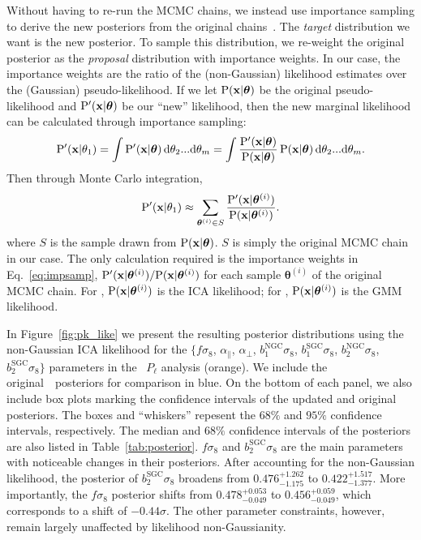 \documentclass[12pt, letterpaper, preprint]{aastex6}
\newcommand{\beq}{\begin{equation}}
\newcommand{\eeq}{\end{equation}}
\newcommand{\Beut}{\citetalias{beutler2017}\xspace}
\newcommand{\Sinh}{\citetalias{sinha2017}\xspace}
\newcommand{\gmm}{{\small{GMM}}\xspace}
\newcommand{\ica}{{\small{ICA}}\xspace}
\begin{document}
Without having to re-run the MCMC chains, we instead use importance sampling
to derive the new posteriors
from the original chains~\citep[see][for details on importance sampling]{wasserman2004}. 
The \emph{target} distribution we want is the new posterior. To sample this 
distribution, we re-weight the original posterior as the \emph{proposal} 
distribution with importance weights. In our case, the importance weights are the ratio 
of the (non-Gaussian) likelihood estimates over the (Gaussian) pseudo-likelihood. If we let 
$\mathrm{P}({\bf x} | \bm{\theta})$ be the original pseudo-likelihood and 
$\mathrm{P}'({\bf x} | \bm{\theta})$ be our ``new'' likelihood, then the new 
marginal likelihood can be calculated through importance sampling:   
\beq
\mathrm{P}'({\bf x} | \theta_1) = \int \mathrm{P}'({\bf x} | \bm{\theta})\,\mathrm{d}\theta_2...\mathrm{d}\theta_m = \int \frac{\mathrm{P}'({\bf x} | \bm{\theta})}{\mathrm{P}({\bf x} | \bm{\theta})}\, \mathrm{P}({\bf x} | \bm{\theta})\,\mathrm{d}\theta_2...\mathrm{d}\theta_m. \\
\eeq
Then through Monte Carlo integration, 
\beq
\mathrm{P}'({\bf x} | \theta_1) \approx \sum\limits_{\bm{\theta}^{(i)} \in S} \frac{\mathrm{P}'({\bf x} | \bm{\theta}^{(i)})}{\mathrm{P}({\bf x} | \bm{\theta}^{(i)})}. \label{eq:impsamp}
\eeq
where $S$ is the sample drawn from $\mathrm{P}({\bf x} | \bm{\theta})$. $S$ 
is simply the original MCMC chain in our case. The only calculation required 
is the importance weights in Eq.~\ref{eq:impsamp}, 
${\mathrm{P}'({\bf x} | \bm{\theta}^{(i)})}/{\mathrm{P}({\bf x} | \bm{\theta}^{(i)})}$ for 
each sample $\bm{\theta}^{(i)}$ of the original MCMC chain. 
For \Beut, $\mathrm{P}({\bf x} | \bm{\theta}^{(i)})$ is the \ica likelihood;  
for \Sinh, $\mathrm{P}({\bf x} | \bm{\theta}^{(i)})$ is the \gmm
likelihood.


In Figure~\ref{fig:pk_like} we present the resulting posterior 
distributions using the non-Gaussian \ica likelihood for the 
$\big \{f \sigma_8$, $\alpha_\parallel$, $\alpha_\perp$, 
$b_1^\mathrm{NGC} \sigma_8$, $b_1^\mathrm{SGC} \sigma_8$, 
$b_2^\mathrm{NGC} \sigma_8$, $b_2^\mathrm{SGC} \sigma_8\big \}$
parameters in the \Beut~$P_\ell$ analysis (orange). We include 
the original~\Beut~posteriors for comparison in blue. On the 
bottom of each panel, we also include box plots marking the 
confidence intervals of the updated and original posteriors. 
The boxes and ``whiskers'' repesent the $68\%$ and $95\%$ 
confidence intervals, respectively. The median and $68\%$ 
confidence intervals of the posteriors are also listed in Table~\ref{tab:posterior}.
$f \sigma_8$ and $b_2^\mathrm{SGC} \sigma_8$ are the main parameters with 
noticeable changes in their posteriors. After accounting for the 
non-Gaussian likelihood, the posterior of $b_2^\mathrm{SGC} \sigma_8$
broadens from $0.476^{+1.262}_{-1.175}$ to $0.422^{+1.517}_{-1.377}$.
More importantly, the $f \sigma_8$ posterior
shifts from $0.478^{+0.053}_{-0.049}$ to $0.456^{+0.059}_{-0.049}$, which 
corresponds to a shift of $-0.44 \sigma$. The other parameter constraints, 
however, remain largely unaffected by likelihood non-Gaussianity. 
\end{document}
